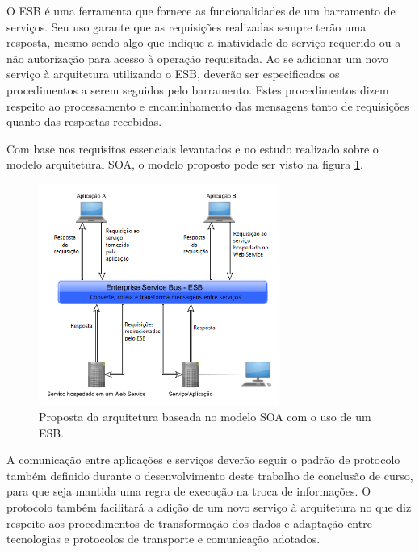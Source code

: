 O ESB é uma ferramenta que fornece as funcionalidades de um barramento de serviços. Seu uso garante que as requisições realizadas sempre terão uma resposta, mesmo sendo algo que indique a inatividade do serviço requerido ou a não autorização para acesso à operação requisitada. Ao se adicionar um novo serviço à arquitetura utilizando o ESB, deverão ser especificados os procedimentos a serem seguidos pelo barramento. Estes procedimentos dizem respeito ao processamento e encaminhamento das mensagens tanto de requisições quanto das respostas recebidas.

Com base nos requisitos essenciais levantados e no estudo realizado sobre o modelo arquitetural SOA, o modelo proposto pode ser visto na figura \ref{uso_esb}.

\begin{figure}[!hbt]
\centering
\includegraphics[width=0.7\textwidth]{figuras/uso_esb.png}
\caption{Proposta da arquitetura baseada no modelo SOA com o uso de um ESB.}
\label{uso_esb}
\end{figure}

A comunicação entre aplicações e serviços deverão seguir o padrão de protocolo também definido durante o desenvolvimento deste trabalho de conclusão de curso, para que seja mantida uma regra de execução na troca de informações. O protocolo também facilitará a adição de um novo serviço à arquitetura no que diz respeito aos procedimentos de transformação dos dados e adaptação entre tecnologias e protocolos de transporte e comunicação adotados.

